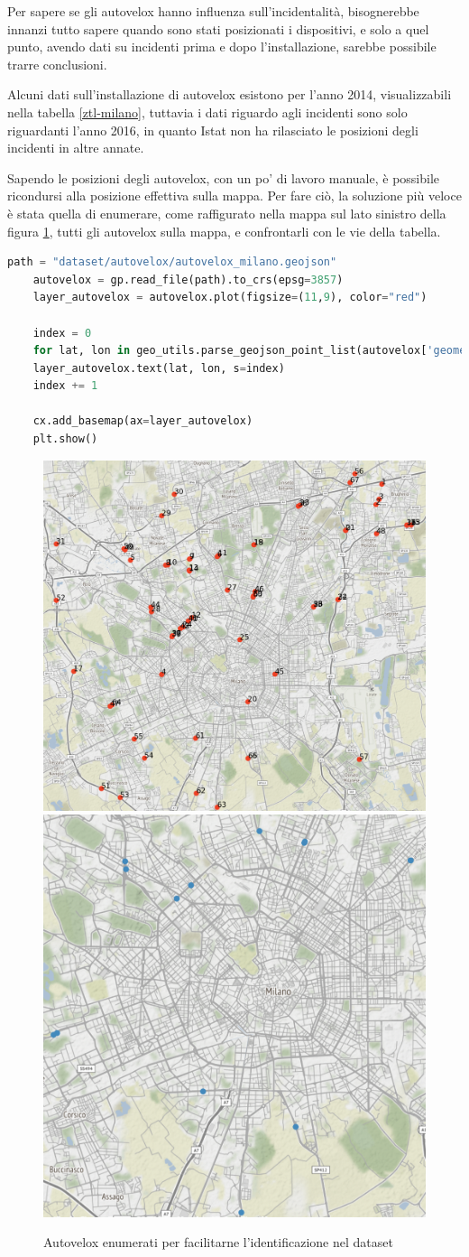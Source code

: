 \documentclass[a4paper]{report}
\begin{document}
Per sapere se gli autovelox hanno influenza sull'incidentalità, 
bisognerebbe innanzi tutto sapere quando sono stati posizionati i dispositivi, e solo a quel punto, 
avendo dati su incidenti prima e dopo l'installazione, sarebbe possibile trarre conclusioni.

Alcuni dati sull'installazione di autovelox esistono per l'anno 2014, visualizzabili nella 
tabella \ref{ztl-milano}, tuttavia i dati 
riguardo agli incidenti sono solo riguardanti l'anno 2016, in quanto Istat non ha rilasciato 
le posizioni degli incidenti in altre annate.

Sapendo le posizioni degli autovelox, con un po' di lavoro manuale, è possibile ricondursi alla 
posizione effettiva sulla mappa.
Per fare ciò, la soluzione più veloce è stata quella di enumerare, 
come raffigurato nella mappa sul lato sinistro della figura \ref{fig:autovelox-indici}, 
tutti gli autovelox sulla mappa, e confrontarli con le vie della tabella.

\begin{lstlisting}[language=Python]
    path = "dataset/autovelox/autovelox_milano.geojson"
    autovelox = gp.read_file(path).to_crs(epsg=3857)
    layer_autovelox = autovelox.plot(figsize=(11,9), color="red")
    
    index = 0
    for lat, lon in geo_utils.parse_geojson_point_list(autovelox['geometry'].astype(str)):
    layer_autovelox.text(lat, lon, s=index)
    index += 1
    
    cx.add_basemap(ax=layer_autovelox)
    plt.show()
\end{lstlisting}

\begin{figure}
    \includegraphics[width=0.6\linewidth]{../src/autovelox/autovelox_indici.png}
    \includegraphics[width=0.4\linewidth]{../src/autovelox/autovelox_2014.png}
    \caption{Autovelox enumerati per facilitarne l'identificazione nel dataset}
    \label{fig:autovelox-indici}
\end{figure}
\end{document}

